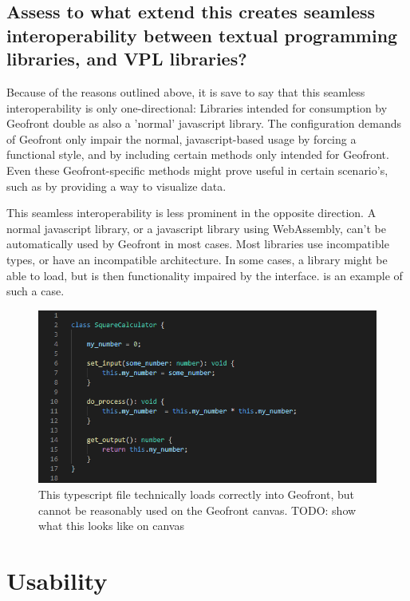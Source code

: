 \subsection*{Assess to what extend this creates seamless interoperability between textual programming libraries, and VPL libraries?}

Because of the reasons outlined above, it is save to say that this seamless interoperability is only one-directional: Libraries intended for consumption by Geofront double as also a 'normal' javascript library. 
The configuration demands of Geofront only impair the normal, javascript-based usage by forcing a functional style, and by including certain methods only intended for Geofront. 
Even these Geofront-specific methods might prove useful in certain scenario's, such as by providing a way to visualize data.

This seamless interoperability is less prominent in the opposite direction. 
A normal javascript library, or a javascript library using WebAssembly, can't be automatically used by Geofront in most cases. 
Most libraries use incompatible types, or have an incompatible architecture.
In some cases, a library might be able to load, but is then functionality impaired by the interface. 
 is an example of such a case.

\begin{figure}
  \centering
  \graphicspath{ {../../assets/images/6/3/} }
  \includegraphics[width=\linewidth]{ugly-oop.png}
  \caption[]{This typescript file technically loads correctly into Geofront, but cannot be reasonably used on the Geofront canvas. TODO: show what this looks like on canvas}
  \label{fig:oop-considered-harmful}
\end{figure}

\section{Usability}
\label{sec:analyses:utilization}


